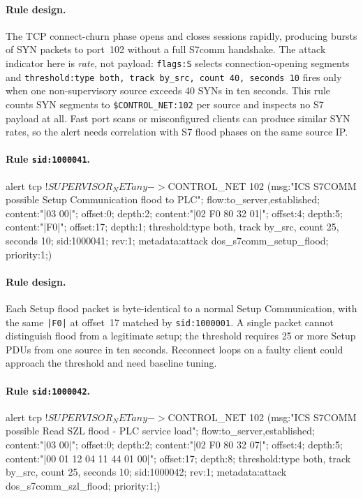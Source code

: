 \documentclass[../main.tex]{subfiles}
\begin{document}
\paragraph{Rule design.}
The TCP connect-churn phase opens and closes sessions rapidly, producing bursts of SYN packets to port~102 without a full S7comm handshake. The attack indicator here is \emph{rate}, not payload: \texttt{flags:S} selects connection-opening segments and \texttt{threshold:type both, track by\_src, count 40, seconds 10} fires only when one non-supervisory source exceeds 40 SYNs in ten seconds. This rule counts SYN segments to \texttt{\$CONTROL\_NET:102} per source and inspects no S7 payload at all. Fast port scans or misconfigured clients can produce similar SYN rates, so the alert needs correlation with S7 flood phases on the same source IP.

\paragraph{Rule \texttt{sid:1000041}.}
\begin{packetdump}
alert tcp !$SUPERVISOR_NET any -> $CONTROL_NET 102 (msg:"ICS S7COMM possible Setup Communication flood to PLC";
  flow:to_server,established; content:"|03 00|"; offset:0; depth:2;
  content:"|02 F0 80 32 01|"; offset:4; depth:5; content:"|F0|"; offset:17; depth:1;
  threshold:type both, track by_src, count 25, seconds 10; sid:1000041; rev:1;
  metadata:attack dos_s7comm_setup_flood; priority:1;)
\end{packetdump}

\paragraph{Rule design.}
Each Setup flood packet is byte-identical to a normal Setup Communication, with the same \texttt{|F0|} at offset~17 matched by \texttt{sid:1000001}. A single packet cannot distinguish flood from a legitimate setup; the threshold requires 25 or more Setup PDUs from one source in ten seconds. Reconnect loops on a faulty client could approach the threshold and need baseline tuning.

\paragraph{Rule \texttt{sid:1000042}.}
\begin{packetdump}
alert tcp !$SUPERVISOR_NET any -> $CONTROL_NET 102 (msg:"ICS S7COMM possible Read SZL flood - PLC service load";
  flow:to_server,established; content:"|03 00|"; offset:0; depth:2;
  content:"|02 F0 80 32 07|"; offset:4; depth:5;
  content:"|00 01 12 04 11 44 01 00|"; offset:17; depth:8;
  threshold:type both, track by_src, count 25, seconds 10; sid:1000042; rev:1;
  metadata:attack dos_s7comm_szl_flood; priority:1;)
\end{packetdump}
\end{document}
